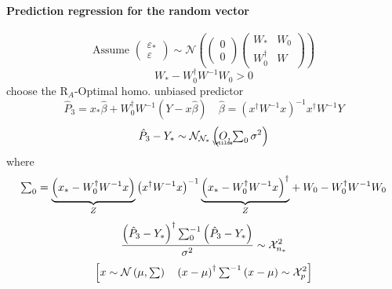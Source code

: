 \documentclass{article}
\begin{document}
\bigskip

\paragraph{Prediction regression for the random vector}

\begin{equation*}
\text{Assume }\left( 
\begin{array}{c}
\varepsilon _{\ast } \\ 
\varepsilon%
\end{array}%
\right) \sim \mathcal{N}\left( \left( 
\begin{array}{c}
0 \\ 
0%
\end{array}%
\right) \left( 
\begin{array}{cc}
W_{\ast } & W_{0} \\ 
W_{0}^{\dagger } & W%
\end{array}%
\right) \right)
\end{equation*}%
\begin{equation*}
W_{\ast }-W_{0}^{\dagger }W^{-1}W_{0}>0
\end{equation*}%
choose the R$_{A}$-Optimal homo. unbiased predictor%
\begin{equation*}
\hat{P}_{3}=x_{\ast }\hat{\beta}+W_{0}^{\dagger }W^{-1}\left( Y-x\hat{\beta}%
\right) \quad \hat{\beta}=\left( x^{\dagger }W^{-1}x\right) ^{-1}x^{\dagger
}W^{-1}Y
\end{equation*}%
\begin{equation*}
\hat{P}_{3}-Y_{\ast }\sim \mathcal{N}_{\mathcal{N}_{\ast }}\left( 
\underaccent{\wtilde}{O}%
,\tsum\nolimits_{0}\sigma ^{2}\right)
\end{equation*}%
where%
\begin{equation*}
\tsum\nolimits_{0}=\underset{Z}{\underbrace{\left( x_{\ast }-W_{0}^{\dagger
}W^{-1}x\right) }}\left( x^{\dagger }W^{-1}x\right) ^{-1}\underset{Z}{%
\underbrace{\left( x_{\ast }-W_{0}^{\dagger }W^{-1}x\right) ^{\dagger }}}%
+W_{0}-W_{0}^{\dagger }W^{-1}W_{0}
\end{equation*}%
\begin{equation*}
\frac{\left( \hat{P}_{3}-Y_{\ast }\right) ^{\dagger
}\tsum\nolimits_{0}^{-1}\left( \hat{P}_{3}-Y_{\ast }\right) }{\sigma ^{2}}%
\sim \mathcal{X}_{n_{\ast }}^{2}
\end{equation*}%
\begin{equation*}
\left[ x\sim \mathcal{N}\left( \mu ,\tsum \right) \quad \left( x-\mu \right)
^{\dagger }\tsum\nolimits^{-1}\left( x-\mu \right) \sim \mathcal{X}_{p}^{2}%
\right]
\end{equation*}
\end{document}
